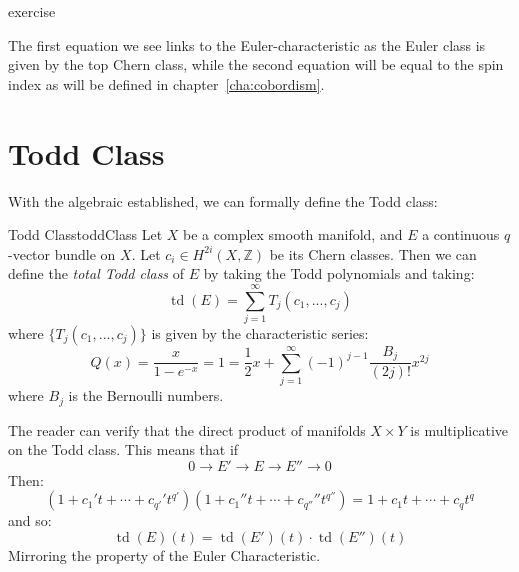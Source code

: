 \documentclass{book}
\newcommand{\Z}{{\mathbb{Z}}}
\newcommand{\td}{{\operatorname{td}}}
\begin{document}
\begin{Proof}
  exercise
\end{Proof}
The first equation we see links to the Euler-characteristic as the Euler class is given by the top Chern class,
while the second equation will be equal to the spin index as will be defined in chapter~\ref{cha:cobordism}.
%
%
%
%

\section{Todd Class}

With the algebraic established, we can formally define the Todd class:

\begin{defn}{Todd Class}{toddClass}
  Let $X$ be a complex smooth manifold, and $E$ a continuous $q$-vector bundle on $X$. Let $c_i \in H^{2i}(X, \Z)$
  be its Chern classes. Then we can define the \emph{total Todd class} of $E$ by taking the Todd polynomials
  and taking:
  \[
    \td(E) = \sum_{j=1}^\infty T_j(c_1, ..., c_j)
  \]
  where $\{T_j(c_1, ..., c_j)\}$ is given by the characteristic series:
  \[
    Q(x) = \frac{x}{1-e^{-x}} = 1 = \frac{1}{2}x + \sum_{j=1}^\infty (-1)^{j-1} \frac{B_j}{(2j)!}x^{2j}
  \]
  where $B_j$ is the Bernoulli numbers.
\end{defn}
The reader can verify that the direct product of manifolds $X\times Y$ is multiplicative on the Todd class.
This means that if
\[
  0 \to E' \to E \to E'' \to 0
\]
Then:
\[
  (1 + c_1't + \cdots + c_{q'}'t^{q'})(1 + c_1''t + \cdots + c_{q''}''t^{q''}) =  1 + c_1t + \cdots + c_{q}t^{q}
\]
and so:
\[
  \td(E)(t) = \td(E')(t)\cdot \td(E'')(t)
\]
Mirroring the property of the Euler Characteristic.
\end{document}
